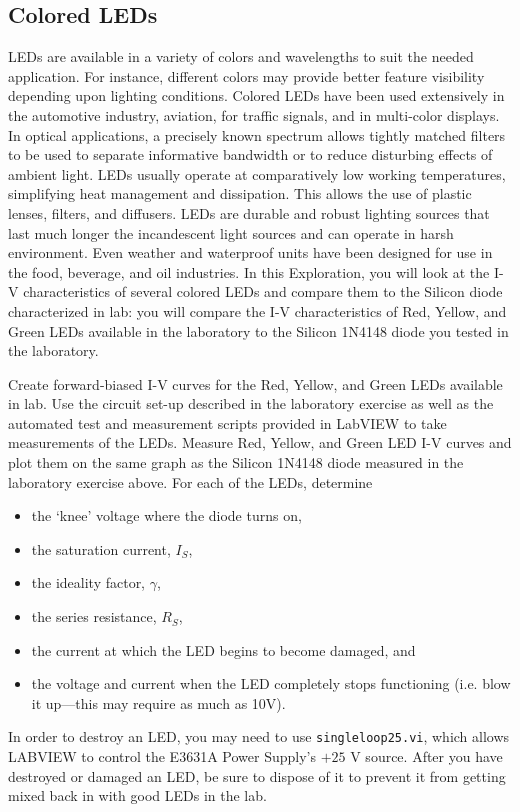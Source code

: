 \documentclass[12pt]{../manual}
\begin{document}
\newpage
\subsection{Colored LEDs}
LEDs are available in a variety of colors and wavelengths to suit the needed application. For instance, different colors may provide better feature visibility depending upon lighting conditions. Colored LEDs have been used extensively in the automotive industry, aviation, for traffic signals, and in multi-color displays. In optical applications, a precisely known spectrum allows tightly matched filters to be used to separate informative bandwidth or to reduce disturbing effects of ambient light. LEDs usually operate at comparatively low working temperatures, simplifying heat management and dissipation. This allows the use of plastic lenses, filters, and diffusers. LEDs are durable and robust lighting sources that last much longer the incandescent light sources and can operate in harsh environment. Even weather and waterproof units have been designed for use in the food, beverage, and oil industries. In this Exploration, you will look at the I-V characteristics of several colored LEDs and compare them to the Silicon diode characterized in lab: you will compare the I-V characteristics of Red, Yellow, and Green LEDs available in the laboratory to the Silicon 1N4148 diode you tested in the laboratory.

Create forward-biased I-V curves for the Red, Yellow, and Green LEDs available in lab. Use the circuit set-up described in the laboratory exercise as well as the automated test and measurement scripts provided in LabVIEW to take measurements of the LEDs. Measure Red, Yellow, and Green LED I-V curves and plot them on the same graph as the Silicon 1N4148 diode measured in the laboratory exercise above. For each of the LEDs, determine 
\renewcommand\labelitemi{$\square$}
\begin{itemize}
\item the `knee' voltage where the diode turns on, 
\item the saturation current, $I_S$, 
\item the ideality factor, $\gamma$,
\item the series resistance, $R_S$,
\item the current at which the LED begins to become damaged, and 
\item the voltage and current when the LED completely stops functioning (i.e. blow it up---this may require as much as 10V). 
\end{itemize}
In order to destroy an LED, you may need to use {\tt singleloop25.vi}, which allows LABVIEW to control the E3631A Power Supply's $+25$ V source. After you have destroyed or damaged an LED, be sure to dispose of it to prevent it from getting mixed back in with good LEDs in the lab.
\end{document}
